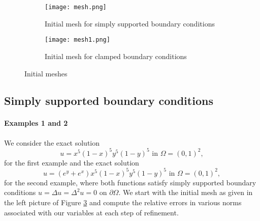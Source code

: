 \documentclass[a4paper,final]{siamltex}
\begin{document}
\begin{figure}[htb]
	\centering
	\begin{subfigure}{.3\textwidth}
		\centering
		\texttt{[image: mesh.png]}
		\caption{Initial mesh for simply supported boundary conditions}
		\label{fig:init1}
	\end{subfigure} 
	\hspace{2cm}
	\begin{subfigure}{.4\textwidth}
		\centering
		\texttt{[image: mesh1.png]}
		\caption{Initial mesh for clamped boundary conditions}
		\label{fig:init2}
	\end{subfigure}
	\caption{Initial meshes}
	\label{imesh}
\end{figure}

\setlength\tabcolsep{4 pt}
\subsection{Simply supported boundary conditions}
\paragraph{Examples 1 and 2} 
We consider the exact solution
\begin{equation}\label{ex.sol.1}
u = x^5(1-x)^5y^5(1-y)^5 \text{ in $\Omega = \left(0,1\right)^2$},
\end{equation}
for the first example and  the exact solution 
\begin{equation}\label{ex.sol.2}
u = \left(e^y + e^x\right)x^5(1-x)^5y^5(1-y)^5 \text{ in $\Omega = \left(0,1\right)^2$},
\end{equation}
for the second example, where both functions satisfy simply supported boundary conditions $u = \Delta u = \Delta^2 u = 0$ on $\partial\Omega$. 
We start with the initial mesh as given in the left picture of Figure \ref{imesh} and 
compute the relative errors in various norms associated with our variables at each step of refinement.
\end{document}

